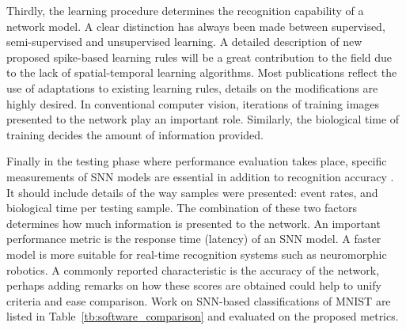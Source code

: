 Thirdly, the learning procedure determines the recognition capability of a network model.
A clear distinction has always been made between supervised, semi-supervised and unsupervised learning.
A detailed description of new proposed spike-based learning rules will be a great contribution to the field due to the lack of spatial-temporal learning algorithms.
Most publications reflect the use of adaptations to existing learning rules, details on the modifications are highly desired.
In conventional computer vision, iterations of training images presented to the network play an important role.
Similarly, the biological time of training decides the amount of information provided.



Finally in the testing phase where performance evaluation takes place, specific measurements of SNN models are essential in addition to recognition accuracy .
It should include details of the way samples were presented: event rates, and biological time per testing sample.
The combination of these two factors determines how much information is presented to the network.
An important performance metric is the response time (latency) of an SNN model.
A faster model is more suitable for real-time recognition systems such as neuromorphic robotics.
A commonly reported characteristic is the accuracy of the network, perhaps adding remarks on how these scores are obtained could help to unify criteria and ease comparison.
Work on SNN-based classifications of MNIST are listed in Table~\ref{tb:software_comparison} and evaluated on the proposed metrics.

